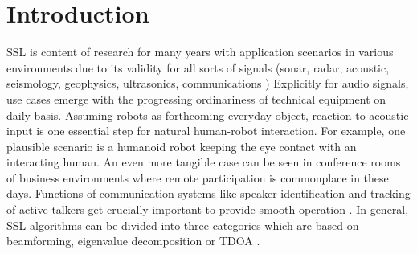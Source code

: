 \chapter{Introduction}
\label{chap:01_introduction}



\acf{SSL} is content of research for many years with
application scenarios in various environments due to its
validity for all sorts of signals (sonar, radar, acoustic, seismology,
geophysics, ultrasonics, communications \cite{Chen2006}) 
Explicitly for audio signals, use cases emerge with the progressing
ordinariness of technical equipment on daily basis.
Assuming robots as forthcoming everyday object, reaction to acoustic
input is one essential step for natural human-robot interaction.
For example, one plausible scenario is a humanoid robot keeping the eye
contact with an interacting human.
An even more tangible case can be seen in conference rooms of business environments
where remote participation is commonplace in these days.
Functions of communication systems like speaker identification and tracking of active talkers
get crucially important to provide smooth operation \cite{Brandstein96apractical}.
In general, \ac{SSL} algorithms can be divided into three categories
which are based on beamforming, eigenvalue decomposition or \ac{TDOA} \cite{Brandstein96apractical}.


